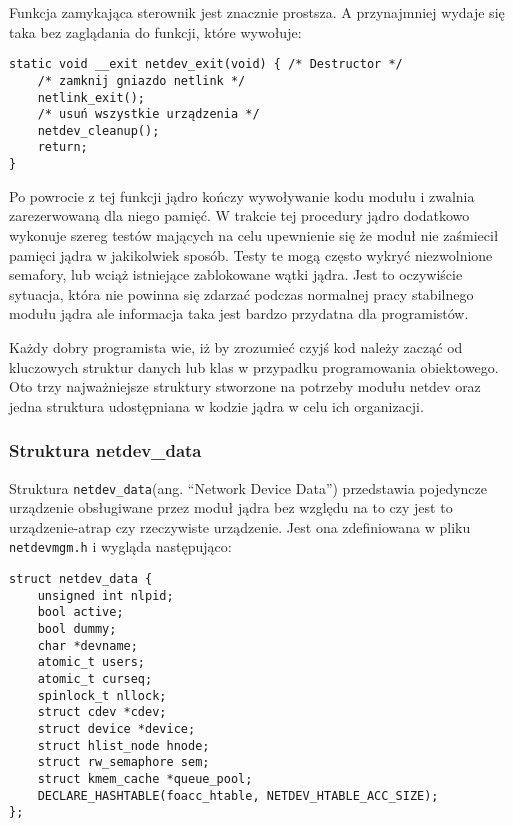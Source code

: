 Funkcja zamykająca sterownik jest znacznie prostsza. A przynajmniej
wydaje się taka bez zaglądania do funkcji, które wywołuje:

\begin{verbatim}
static void __exit netdev_exit(void) { /* Destructor */
    /* zamknij gniazdo netlink */
    netlink_exit();
    /* usuń wszystkie urządzenia */
    netdev_cleanup();
    return;
}
\end{verbatim}

Po powrocie z tej funkcji jądro kończy wywoływanie kodu modułu i zwalnia
zarezerwowaną dla niego pamięć. W trakcie tej procedury jądro dodatkowo
wykonuje szereg testów mających na celu upewnienie się że moduł nie
zaśmiecił pamięci jądra w jakikolwiek sposób. Testy te mogą często
wykryć niezwolnione semafory, lub wciąż istniejące zablokowane wątki
jądra. Jest to oczywiście sytuacja, która nie powinna się zdarzać
podczas normalnej pracy stabilnego modułu jądra ale informacja taka jest
bardzo przydatna dla programistów.


Każdy dobry programista wie, iż by zrozumieć czyjś kod należy zacząć od
kluczowych struktur danych lub klas w przypadku programowania
obiektowego. Oto trzy najważniejsze struktury stworzone na potrzeby
modułu netdev oraz jedna struktura udostępniana w kodzie jądra w celu
ich organizacji.

\subsubsection{Struktura netdev\_data}

Struktura \texttt{netdev\_data}(ang. ``Network Device Data'')
przedstawia pojedyncze urządzenie obsługiwane przez moduł jądra bez
względu na to czy jest to urządzenie-atrap czy rzeczywiste urządzenie.
Jest ona zdefiniowana w pliku \texttt{netdevmgm.h} i wygląda
następująco:

\begin{verbatim}
struct netdev_data {
    unsigned int nlpid;
    bool active;
    bool dummy;
    char *devname;
    atomic_t users;
    atomic_t curseq;
    spinlock_t nllock;
    struct cdev *cdev;
    struct device *device;
    struct hlist_node hnode;
    struct rw_semaphore sem;
    struct kmem_cache *queue_pool;
    DECLARE_HASHTABLE(foacc_htable, NETDEV_HTABLE_ACC_SIZE);
};
\end{verbatim}

